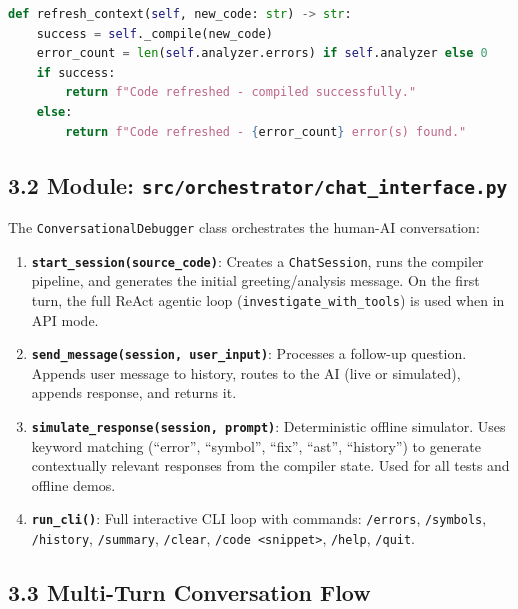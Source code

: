 \documentclass[a4paper,11pt]{article}
\begin{document}
\begin{lstlisting}[language=Python, caption=ChatSession example: refresh\_context()]
def refresh_context(self, new_code: str) -> str:
    success = self._compile(new_code)
    error_count = len(self.analyzer.errors) if self.analyzer else 0
    if success:
        return f"Code refreshed - compiled successfully."
    else:
        return f"Code refreshed - {error_count} error(s) found."
\end{lstlisting}

\subsection{3.2 Module: \texttt{src/orchestrator/chat\_interface.py}}

The \texttt{ConversationalDebugger} class orchestrates the human-AI conversation:

\begin{enumerate}
    \item \textbf{\texttt{start\_session(source\_code)}}: Creates a \texttt{ChatSession}, runs the compiler pipeline, and generates the initial greeting/analysis message. On the first turn, the full ReAct agentic loop (\texttt{investigate\_with\_tools}) is used when in API mode.
    \item \textbf{\texttt{send\_message(session, user\_input)}}: Processes a follow-up question. Appends user message to history, routes to the AI (live or simulated), appends response, and returns it.
    \item \textbf{\texttt{simulate\_response(session, prompt)}}: Deterministic offline simulator. Uses keyword matching (``error'', ``symbol'', ``fix'', ``ast'', ``history'') to generate contextually relevant responses from the compiler state. Used for all tests and offline demos.
    \item \textbf{\texttt{run\_cli()}}: Full interactive CLI loop with commands: \texttt{/errors}, \texttt{/symbols}, \texttt{/history}, \texttt{/summary}, \texttt{/clear}, \texttt{/code <snippet>}, \texttt{/help}, \texttt{/quit}.
\end{enumerate}

\subsection{3.3 Multi-Turn Conversation Flow}
\end{document}
